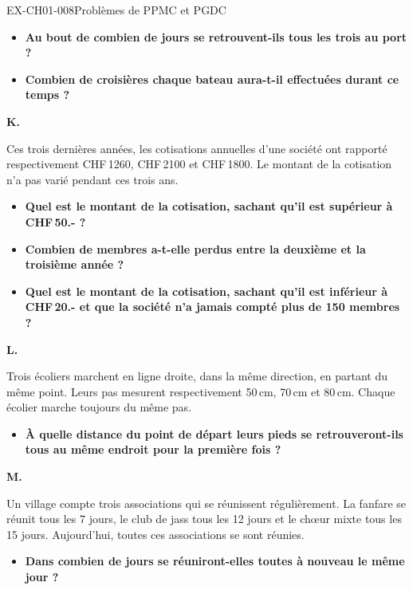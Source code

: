\begin{exercice}{EX-CH01-008}{Problèmes de PPMC et PGDC}
\begin{itemize}[label=$\blacktriangleright$]
\item \textbf{Au bout de combien de jours se retrouvent-ils tous les trois au port ?}
\item \textbf{Combien de croisières chaque bateau aura-t-il effectuées durant ce temps ?}
\end{itemize}

\bigskip\textbf{K.}

\medskip
Ces trois dernières années, les cotisations annuelles d'une société ont rapporté respectivement CHF\,1260, CHF\,2100 et CHF\,1800.
Le montant de la cotisation n'a pas varié pendant ces trois ans.

\begin{itemize}[label=$\blacktriangleright$]
\item \textbf{Quel est le montant de la cotisation, sachant qu'il est supérieur à CHF\,50.- ?}
\item \textbf{Combien de membres a-t-elle perdus entre la deuxième et la troisième année ?}
\item \textbf{Quel est le montant de la cotisation, sachant qu'il est inférieur à CHF\,20.- et que la société n'a jamais compté plus de 150 membres ?}
\end{itemize}

\bigskip\textbf{L.}

\medskip
Trois écoliers marchent en ligne droite, dans la même direction, en partant du même point. Leurs pas mesurent respectivement 50\,cm, 70\,cm et 80\,cm. Chaque écolier marche toujours du même pas.

\begin{itemize}[label=$\blacktriangleright$]
\item \textbf{À quelle distance du point de départ leurs pieds se retrouveront-ils tous au même endroit pour la première fois ?}
\end{itemize}

\bigskip\textbf{M.}

\medskip
Un village compte trois associations qui se réunissent régulièrement. La fanfare se réunit tous les 7 jours, le club de jass tous les 12 jours et le chœur mixte tous les 15 jours. Aujourd'hui, toutes ces associations se sont réunies.

\begin{itemize}[label=$\blacktriangleright$]
\item \textbf{Dans combien de jours se réuniront-elles toutes à nouveau le même jour ?}
\end{itemize}


\end{exercice}
